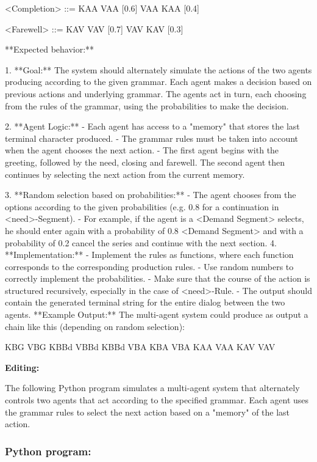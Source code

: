\documentclass[
]{article}
\begin{document}
\textless Completion\textgreater{} ::= KAA VAA {[}0.6{]} \textbar{} VAA
KAA {[}0.4{]}

\textless Farewell\textgreater{} ::= KAV VAV {[}0.7{]} \textbar{} VAV
KAV {[}0.3{]}

**Expected behavior:**

1. **Goal:** The system should alternately simulate the actions of the
two agents producing according to the given grammar. Each agent makes a
decision based on previous actions and underlying grammar. The agents
act in turn, each choosing from the rules of the grammar, using the
probabilities to make the decision.

2. **Agent Logic:** - Each agent has access to a "memory" that stores
the last terminal character produced. - The grammar rules must be taken
into account when the agent chooses the next action. - The first agent
begins with the greeting, followed by the need, closing and farewell.
The second agent then continues by selecting the next action from the
current memory.

3. **Random selection based on probabilities:** - The agent chooses from
the options according to the given probabilities (e.g. 0.8 for a
continuation in \textless need\textgreater-Segment). - For example, if
the agent is a \textless Demand Segment\textgreater{} selects, he should
enter again with a probability of 0.8 \textless Demand
Segment\textgreater{} and with a probability of 0.2 cancel the series
and continue with the next section. 4. **Implementation:** - Implement
the rules as functions, where each function corresponds to the
corresponding production rules. - Use random numbers to correctly
implement the probabilities. - Make sure that the course of the action
is structured recursively, especially in the case of
\textless need\textgreater-Rule. - The output should contain the
generated terminal string for the entire dialog between the two agents.
**Example Output:** The multi-agent system could produce as output a
chain like this (depending on random selection):

KBG VBG KBBd VBBd KBBd VBA KBA VBA KAA VAA KAV VAV

\textbf{Editing:}

The following Python program simulates a multi-agent system that
alternately controls two agents that act according to the specified
grammar. Each agent uses the grammar rules to select the next action
based on a "memory" of the last action.

\subsubsection{\texorpdfstring{\textbf{Python
program:}}{Python program:}}\label{python-program}
\end{document}
